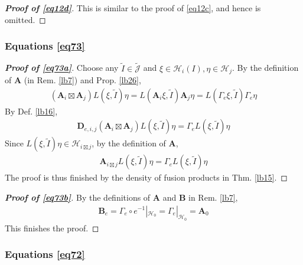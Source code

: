 \documentclass[11pt,b5paper,notitlepage]{article}
\theoremstyle{definition}
\theoremstyle{plain}
\newcommand{\wtd}{\widetilde}
\newcommand{\Jtd}{\widetilde{\mathcal J}}
\newcommand{\mbf}{\mathbf}
\newcommand{\MH}{\mathcal H}
\numberwithin{equation}{section}
\begin{document}
\begin{appendices}
\begin{proof}[\textbf{Proof of \eqref{eq12d}}]
This is similar to the proof of \eqref{eq12c}, and hence is omitted.
\end{proof}


\subsubsection{Equations \eqref{eq73}}


\begin{proof}[\textbf{Proof of \eqref{eq73a}}]
Choose any $\wtd I\in\Jtd$ and $\xi\in\MH_i(I),\eta\in\MH_j$. 
By the definition of $\mbf A$ (in Rem. \ref{lb7}) and Prop. \ref{lb26},
\begin{align*}
(\mbf A_i\boxtimes\mbf A_j)L(\xi,\wtd I)\eta=L(\mbf A_i\xi,\wtd I)\mbf A_j\eta=L(\Gamma_e\xi,\wtd I)\Gamma_e\eta
\end{align*}
By Def. \ref{lb16},
\begin{align*}
\mbf D_{e,i,j}(\mbf A_i\boxtimes\mbf A_j)L(\xi,\wtd I)\eta=\Gamma_eL(\xi,\wtd I)\eta
\end{align*}
Since $L(\xi,\wtd I)\eta\in\MH_{i\boxtimes j}$, by the definition of $\mbf A$,
\begin{align*}
\mbf A_{i\boxtimes j}L(\xi,\wtd I)\eta=\Gamma_eL(\xi,\wtd I)\eta
\end{align*}
The proof is thus finished by the density of fusion products in Thm. \ref{lb15}.
\end{proof}


\begin{proof}[\textbf{Proof of \eqref{eq73b}}]
By the definitions of $\mbf A$ and $\mbf B$ in Rem. \ref{lb7},
\begin{align*}
\mbf B_e=\Gamma_e\circ e^{-1}|_{\MH_0}=\Gamma_e|_{\MH_0}=\mbf A_0
\end{align*}
This finishes the proof.
\end{proof}







\subsubsection{Equations \eqref{eq72}}



\end{appendices}
\end{document}
